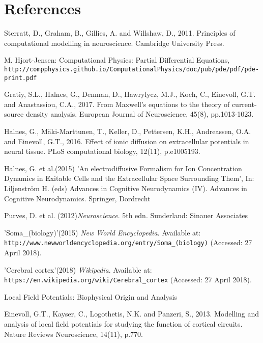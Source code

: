 \documentclass{article}
\begin{document}
\section{References}

\begin{thebibliography}{1}

Sterratt, D., Graham, B., Gillies, A. and Willshaw, D., 2011. Principles of computational modelling in neuroscience. Cambridge University Press.

M. Hjort-Jensen: Computational Physics: Partial Differential Equations,
\\\texttt{http://compphysics.github.io/ComputationalPhysics/doc/pub/pde/pdf/pde-print.pdf}

Gratiy, S.L., Halnes, G., Denman, D., Hawrylycz, M.J., Koch, C., Einevoll, G.T. and Anastassiou, C.A., 2017. From Maxwell's equations to the theory of current-source density analysis. European Journal of Neuroscience, 45(8), pp.1013-1023.


Halnes, G., Mäki-Marttunen, T., Keller, D., Pettersen, K.H., Andreassen, O.A. and Einevoll, G.T., 2016. Effect of ionic diffusion on extracellular potentials in neural tissue. PLoS computational biology, 12(11), p.e1005193.


Halnes, G. et al.(2015) 'An electrodiffusive Formalism for Ion Concentration Dynamics in Exitable Cells and the Extracellular Space Surrounding Them',
In: Liljenström H. (eds) Advances in Cognitive Neurodynamics (IV). Advances in Cognitive Neurodynamics. Springer, Dordrecht


Purves, D. et al. (2012)\textit{Neuroscience}. 5th edn.
Sunderland: Sinauer Associates


'Soma\_(biology)'(2015) \textit{New World Encyclopedia}. Available at:
\\\texttt{http://www.newworldencyclopedia.org/entry/Soma\_(biology)} (Accessed: 27 April 2018).

'Cerebral cortex'(2018) \textit{Wikipedia}. Available at:
\\\texttt{https://en.wikipedia.org/wiki/Cerebral\_cortex} (Accessed: 27 April 2018).


Local	Field	Potentials:	Biophysical	Origin
and	Analysis


Einevoll, G.T., Kayser, C., Logothetis, N.K. and Panzeri, S., 2013. Modelling and analysis of local field potentials for studying the function of cortical circuits. Nature Reviews Neuroscience, 14(11), p.770.




\end{thebibliography}
\end{document}
